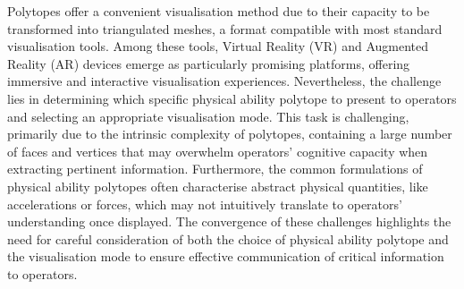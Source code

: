 Polytopes offer a convenient visualisation method due to their capacity to be transformed into triangulated meshes, a format compatible with most standard visualisation tools. Among these tools, Virtual Reality (VR) and Augmented Reality (AR) devices emerge as particularly promising platforms, offering immersive and interactive visualisation experiences. Nevertheless, the challenge lies in determining which specific physical ability polytope to present to operators and selecting an appropriate visualisation mode. This task is challenging, primarily due to the intrinsic complexity of polytopes, containing a large number of faces and vertices that may overwhelm operators' cognitive capacity when extracting pertinent information. Furthermore, the common formulations of physical ability polytopes often characterise abstract physical quantities, like accelerations or forces, which may not intuitively translate to operators' understanding once displayed. The convergence of these challenges highlights the need for careful consideration of both the choice of physical ability polytope and the visualisation mode to ensure effective communication of critical information to operators.


